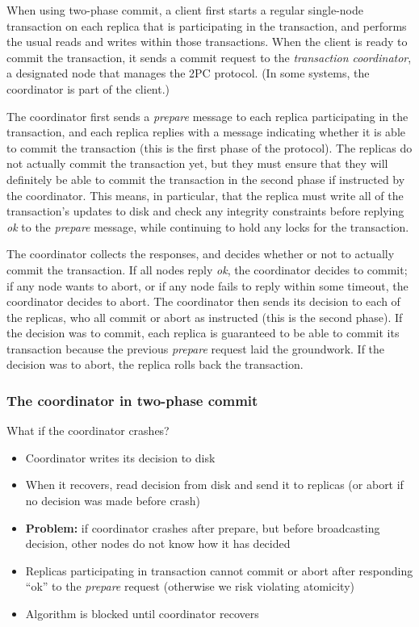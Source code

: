 When using two-phase commit, a client first starts a regular single-node transaction on each replica that is participating in the transaction, and performs the usual reads and writes within those transactions.
When the client is ready to commit the transaction, it sends a commit request to the \emph{transaction coordinator}, a designated node that manages the 2PC protocol.
(In some systems, the coordinator is part of the client.)

The coordinator first sends a \emph{prepare} message to each replica participating in the transaction, and each replica replies with a message indicating whether it is able to commit the transaction (this is the first phase of the protocol).
The replicas do not actually commit the transaction yet, but they must ensure that they will definitely be able to commit the transaction in the second phase if instructed by the coordinator.
This means, in particular, that the replica must write all of the transaction's updates to disk and check any integrity constraints before replying \emph{ok} to the \emph{prepare} message, while continuing to hold any locks for the transaction.

The coordinator collects the responses, and decides whether or not to actually commit the transaction.
If all nodes reply \emph{ok}, the coordinator decides to commit; if any node wants to abort, or if any node fails to reply within some timeout, the coordinator decides to abort.
The coordinator then sends its decision to each of the replicas, who all commit or abort as instructed (this is the second phase).
If the decision was to commit, each replica is guaranteed to be able to commit its transaction because the previous \emph{prepare} request laid the groundwork.
If the decision was to abort, the replica rolls back the transaction.

\begin{frame}
    \label{s:2pc-coordinator}
    \frametitle{The coordinator in two-phase commit}
    What if the coordinator crashes?\pause
    \begin{itemize}
        \item Coordinator writes its decision to disk
        \item When it recovers, read decision from disk and send it to replicas
            (or abort if no decision was made before crash)\pause
        \item \textbf{Problem:} if coordinator crashes after prepare, but before broadcasting decision, other nodes do not know how it has decided\pause
        \item Replicas participating in transaction cannot commit or abort after responding ``ok'' to the \emph{prepare} request (otherwise we risk violating atomicity)\pause
        \item Algorithm is blocked until coordinator recovers\pause
    \end{itemize}
\end{frame}
\label{l:2pc-coordinator}

